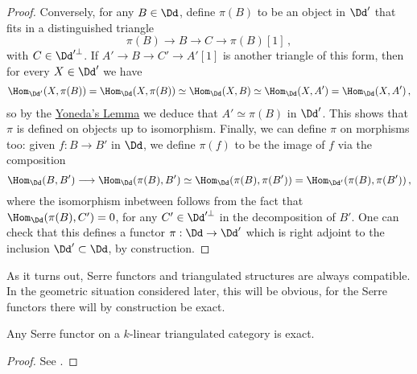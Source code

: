 \begin{lemma}
\begin{proof}
        Conversely, for any $B \in \Dd$, 
        define $\pi(B)$ to be an object in $\Dd'$
        that fits in a distinguished triangle
        \begin{equation*}
            \pi(B) \longrightarrow B \longrightarrow C \longrightarrow \pi(B)[1]\,,
        \end{equation*}
        with $C \in \Dd'^{\perp}$. If $A' \to B \to C' \to A'[1]$
        is another triangle of this form, 
        then for every $X \in \Dd'$ we have
        \begin{align*}
            \Hom_{\Dd'}(X,\pi(B)) 
            = \Hom_{\Dd}(X,\pi(B)) 
            \simeq \Hom_{\Dd}(X,B)
            \simeq \Hom_{\Dd}(X,A')
            = \Hom_{\Dd}(X,A')\,,
        \end{align*}
        so by the \hyperref[yoneda]{Yoneda's Lemma} we deduce
        that $A' \simeq \pi(B)$ in $\Dd'$. This shows that $\pi$
        is defined on objects up to isomorphism.
        Finally, we can define $\pi$ on morphisms too:
        given $f:B \to B'$ in $\Dd$,
        we define $\pi(f)$ to be the image of $f$ via the composition
        \begin{equation*}
            \Hom_{\Dd}(B,B') \longrightarrow
            \Hom_{\Dd}(\pi(B),B') 
            \simeq \Hom_{\Dd}(\pi(B),\pi(B'))
            = \Hom_{\Dd'}(\pi(B),\pi(B'))\,,
        \end{equation*}
        where the isomorphism inbetween follows from the fact that
        $\Hom_{\Dd}(\pi(B),C')=0$, for any $C' \in \Dd'^{\perp}$
        in the decomposition of $B'$.
        One can check that this defines a functor $\pi : \Dd \to \Dd'$
        which is right adjoint to the inclusion $\Dd' \subset \Dd$,
        by construction.
    \end{proof}
\end{lemma}

As it turns out, Serre functors and triangulated structures 
are always compatible. 
In the geometric situation considered later, 
this will be obvious, 
for the Serre functors there will by construction be exact.

\begin{thm}\label{BondalKapranov}
    Any Serre functor on a $k$-linear triangulated category is exact.
    \begin{proof}
        See \parencite[Proposition~1.46]{huybrechts}.
    \end{proof}
\end{thm}